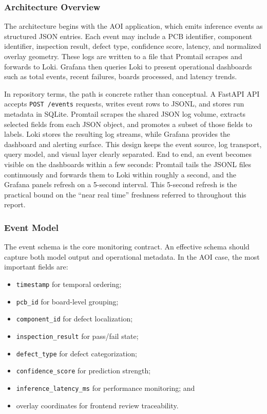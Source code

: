 \documentclass[12pt,a4paper]{article}
\begin{document}
\subsubsection{Architecture Overview}
The architecture begins with the AOI application, which emits inference events
as structured JSON entries. Each event may include a PCB identifier, component
identifier, inspection result, defect type, confidence score, latency, and
normalized overlay geometry. These logs are written to a file that Promtail
scrapes and forwards to Loki. Grafana then queries Loki to present operational
dashboards such as total events, recent failures, boards processed, and latency
trends.

In repository terms, the path is concrete rather than conceptual. A FastAPI API
accepts \texttt{POST /events} requests, writes event rows to JSONL, and stores
run metadata in SQLite. Promtail scrapes the shared JSON log volume,
extracts selected fields from each JSON object, and promotes a subset of those
fields to labels. Loki stores the resulting log streams, while Grafana provides
the dashboard and alerting surface. This design keeps the event source, log
transport, query model, and visual layer clearly separated. End to end, an event
becomes visible on the dashboards within a few seconds: Promtail tails the JSONL
files continuously and forwards them to Loki within roughly a second, and the
Grafana panels refresh on a 5-second interval. This 5-second refresh is the
practical bound on the ``near real time'' freshness referred to throughout this
report.

\subsubsection{Event Model}
The event schema is the core monitoring contract. An effective schema should
capture both model output and operational metadata. In the AOI case, the most
important fields are:
\begin{itemize}
    \item \texttt{timestamp} for temporal ordering;
    \item \texttt{pcb\_id} for board-level grouping;
    \item \texttt{component\_id} for defect localization;
    \item \texttt{inspection\_result} for pass/fail state;
    \item \texttt{defect\_type} for defect categorization;
    \item \texttt{confidence\_score} for prediction strength;
    \item \texttt{inference\_latency\_ms} for performance monitoring; and
    \item overlay coordinates for frontend review traceability.
\end{itemize}
\end{document}
